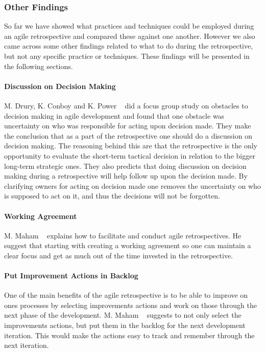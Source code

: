\documentclass[12pt]{article}
\begin{document}
\subsubsection{Other Findings} 
So far we have showed what practices and techniques could be employed during an agile retrospective and compared these against one another. However we also came across some other findings related to what to do during the retrospective, but not any specific practice or techniques. These findings will be presented in the following sections. 

\paragraph{Discussion on Decision Making}
M. Drury, K. Conboy and K. Power ~\cite{Drury2012} did a focus group study on obstacles to decision making in agile development and found that one obstacle was uncertainty on who was responsible for acting upon decision made. They make the conclusion that as a part of the retrospective one should do a discussion on decision making. The reasoning behind this are that the retrospective is the only opportunity to evaluate the short-term tactical decision in relation to the bigger long-term strategic ones. They also predicts that doing discussion on decision making during a retrospective will help follow up upon the decision made. By clarifying owners for acting on decision made one removes the uncertainty on who is supposed to act on it, and thus the decisions will not be forgotten. 

\paragraph{Working Agreement}
M. Maham ~\cite{Maham2008} explains how to facilitate and conduct agile retrospectives. He suggest that starting with creating a working agreement so one can maintain a clear focus and get as much out of the time invested in the retrospective. 

\paragraph{Put Improvement Actions in Backlog}
One of the main benefits of the agile retrospective is to be able to improve on ones processes by selecting improvements actions and work on those through the next phase of the development. M. Maham ~\cite{Maham2008} suggests to not only select the improvements actions, but put them in the backlog for the next development iteration. This would make the actions easy to track and remember through the next iteration. 
\end{document}
